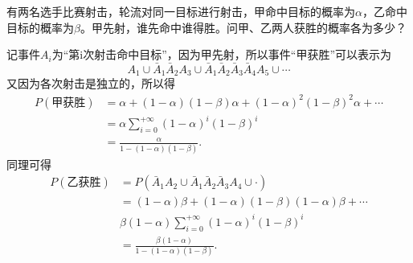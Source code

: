 \begin{example}
    有两名选手比赛射击，轮流对同一目标进行射击，甲命中目标的概率为$\alpha$，乙命中目标的概率为$\beta$。甲先射，谁先命中谁得胜。问甲、乙两人获胜的概率各为多少？
\end{example}
\begin{solution}
    记事件$A_i$为“第i次射击命中目标”，因为甲先射，所以事件“甲获胜”可以表示为
    \[ A_1 \cup \bar A_1\bar A_2 A_3 \cup \bar A_1\bar A_2\bar A_3\bar A_4A_5\cup\cdots \]
    又因为各次射击是独立的，所以得
    \begin{align*}
        P(\text{甲获胜}) & = \alpha + (1-\alpha)(1-\beta)\alpha + (1-\alpha)^2(1-\beta)^2\alpha + \cdots \\
                      & = \alpha\sum_{i=0}^{+\infty}(1-\alpha)^i(1-\beta)^i                           \\
                      & = \frac{\alpha}{1-(1-\alpha)(1-\beta)}.
    \end{align*}
    同理可得
    \begin{align*}
        P(\text{乙获胜}) & = P(\bar A_1A_2\cup \bar A_1\bar A_2\bar A_3A_4\cup\cdot)       \\
                      & = (1-\alpha)\beta + (1-\alpha)(1-\beta)(1-\alpha)\beta + \cdots \\
                      & \beta (1-\alpha)\sum_{i=0}^{+\infty}(1-\alpha)^i(1-\beta)^i     \\
                      & = \frac{\beta(1-\alpha)}{1-(1-\alpha)(1-\beta)}.
    \end{align*}
\end{solution}

